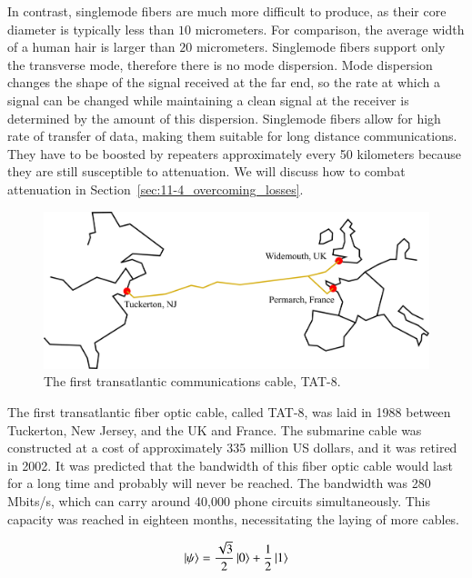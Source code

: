 In contrast, singlemode fibers are much more difficult to produce, as their core diameter is typically less than $10$ micrometers.
For comparison, the average width of a human hair is larger than $20$ micrometers.
Singlemode fibers support only the transverse mode, therefore there is no mode dispersion.
Mode dispersion changes the shape of the signal received at the far end, so the rate at which a signal can be changed while maintaining a clean signal at the receiver is determined by the amount of this dispersion.
Singlemode fibers allow for high rate of transfer of data, making them suitable for long distance communications.
They have to be boosted by repeaters approximately every 50 kilometers because they are still susceptible to attenuation.
We will discuss how to combat attenuation in Section~\ref{sec:11-4_overcoming_losses}.

\begin{figure}[t]
    \centering
    \includegraphics[width=\textwidth]{lesson7/7-4_TAT8.pdf}
    \caption[TAT-8]{The first transatlantic communications cable, TAT-8.}
    \label{fig:7-4_TAT8}
\end{figure}

The first transatlantic fiber optic cable, called TAT-8, was laid in 1988 between Tuckerton, New Jersey, and the UK and France.
The submarine cable was constructed at a cost of approximately 335 million US dollars, and it was retired in 2002.
It was predicted that the bandwidth of this fiber optic cable would last for a long time and probably will never be reached.
The bandwidth was 280 Mbits/s, which can carry around 40,000 phone circuits simultaneously.
This capacity was reached in eighteen months, necessitating the laying of more cables.

\newpage
\begin{exercises}
\begin{equation*}
\left| \psi \right\rangle = \frac{\sqrt{3}}{2}\left| 0 \right\rangle + \frac{1}{2}\left| 1 \right\rangle
\end{equation*}


\end{exercises}

